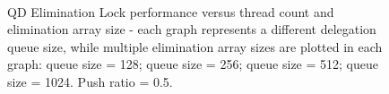 \begin{figure}[]
\centering
{}
\\
\caption[]{QD Elimination Lock performance versus thread count and elimination array size - each graph represents a different delegation queue size, while multiple elimination array sizes are plotted in each graph:  queue size = 128;  queue size = 256;  queue size = 512;  queue size = 1024. Push ratio = 0.5.}
\label{fig:thrd_and_elsize}
\end{figure}

